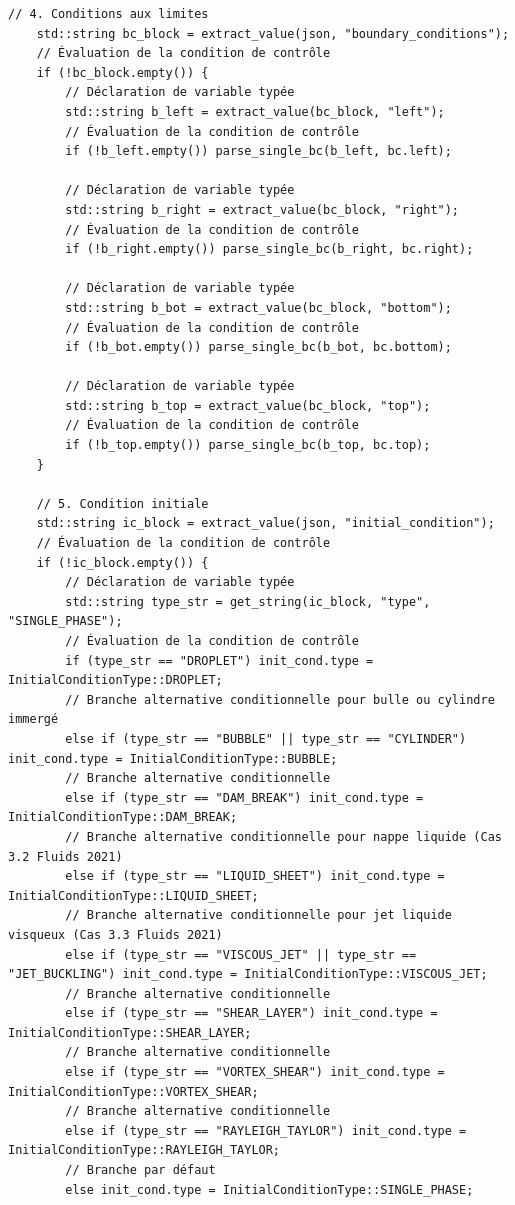 \documentclass[10pt,a4paper,oneside]{book}
\begin{document}
\begin{lstlisting}[language={[11]C++}]
    // 4. Conditions aux limites
    std::string bc_block = extract_value(json, "boundary_conditions");
    // Évaluation de la condition de contrôle
    if (!bc_block.empty()) {
        // Déclaration de variable typée
        std::string b_left = extract_value(bc_block, "left");
        // Évaluation de la condition de contrôle
        if (!b_left.empty()) parse_single_bc(b_left, bc.left);

        // Déclaration de variable typée
        std::string b_right = extract_value(bc_block, "right");
        // Évaluation de la condition de contrôle
        if (!b_right.empty()) parse_single_bc(b_right, bc.right);

        // Déclaration de variable typée
        std::string b_bot = extract_value(bc_block, "bottom");
        // Évaluation de la condition de contrôle
        if (!b_bot.empty()) parse_single_bc(b_bot, bc.bottom);

        // Déclaration de variable typée
        std::string b_top = extract_value(bc_block, "top");
        // Évaluation de la condition de contrôle
        if (!b_top.empty()) parse_single_bc(b_top, bc.top);
    }

    // 5. Condition initiale
    std::string ic_block = extract_value(json, "initial_condition");
    // Évaluation de la condition de contrôle
    if (!ic_block.empty()) {
        // Déclaration de variable typée
        std::string type_str = get_string(ic_block, "type", "SINGLE_PHASE");
        // Évaluation de la condition de contrôle
        if (type_str == "DROPLET") init_cond.type = InitialConditionType::DROPLET;
        // Branche alternative conditionnelle pour bulle ou cylindre immergé
        else if (type_str == "BUBBLE" || type_str == "CYLINDER") init_cond.type = InitialConditionType::BUBBLE;
        // Branche alternative conditionnelle
        else if (type_str == "DAM_BREAK") init_cond.type = InitialConditionType::DAM_BREAK;
        // Branche alternative conditionnelle pour nappe liquide (Cas 3.2 Fluids 2021)
        else if (type_str == "LIQUID_SHEET") init_cond.type = InitialConditionType::LIQUID_SHEET;
        // Branche alternative conditionnelle pour jet liquide visqueux (Cas 3.3 Fluids 2021)
        else if (type_str == "VISCOUS_JET" || type_str == "JET_BUCKLING") init_cond.type = InitialConditionType::VISCOUS_JET;
        // Branche alternative conditionnelle
        else if (type_str == "SHEAR_LAYER") init_cond.type = InitialConditionType::SHEAR_LAYER;
        // Branche alternative conditionnelle
        else if (type_str == "VORTEX_SHEAR") init_cond.type = InitialConditionType::VORTEX_SHEAR;
        // Branche alternative conditionnelle
        else if (type_str == "RAYLEIGH_TAYLOR") init_cond.type = InitialConditionType::RAYLEIGH_TAYLOR;
        // Branche par défaut
        else init_cond.type = InitialConditionType::SINGLE_PHASE;


\end{lstlisting}
\end{document}
